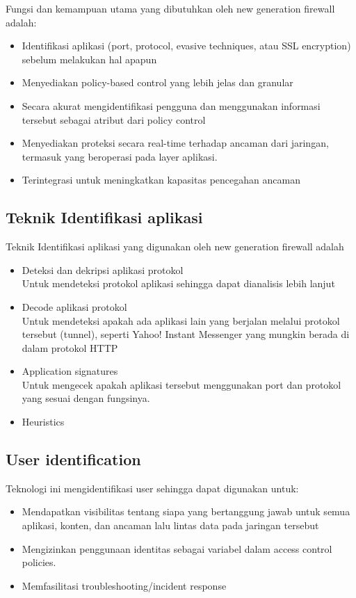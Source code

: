 Fungsi dan kemampuan utama yang dibutuhkan oleh new generation firewall adalah:
\begin{itemize}
	\item Identifikasi aplikasi (port, protocol, evasive techniques, atau SSL encryption) sebelum melakukan hal apapun
	\item Menyediakan policy-based control yang lebih jelas dan granular
	\item Secara akurat mengidentifikasi pengguna dan menggunakan informasi tersebut sebagai atribut dari policy control
	\item Menyediakan proteksi secara real-time terhadap ancaman dari jaringan, termasuk yang beroperasi pada layer aplikasi.
	\item Terintegrasi untuk meningkatkan kapasitas pencegahan ancaman
\end{itemize}

\subsection{Teknik Identifikasi aplikasi}
Teknik Identifikasi aplikasi yang digunakan oleh new generation firewall adalah
\begin{itemize}
	\item Deteksi dan dekripsi aplikasi protokol\\
	Untuk mendeteksi protokol aplikasi sehingga dapat dianalisis lebih lanjut
	\item Decode aplikasi protokol\\
	Untuk mendeteksi apakah ada aplikasi lain yang berjalan melalui protokol tersebut (tunnel), seperti Yahoo! Instant Messenger yang mungkin berada di dalam protokol HTTP
	\item Application signatures\\
	Untuk mengecek apakah aplikasi tersebut menggunakan port dan protokol yang sesuai dengan fungsinya.
	\item Heuristics
\end{itemize}

\subsection{User identification}
Teknologi ini mengidentifikasi user sehingga dapat digunakan untuk:
\begin{itemize}
	\item Mendapatkan visibilitas tentang siapa yang bertanggung jawab untuk semua aplikasi, konten, dan ancaman lalu lintas data pada jaringan tersebut
	\item Mengizinkan penggunaan identitas sebagai variabel dalam access control policies.
	\item Memfasilitasi troubleshooting/incident response
\end{itemize}

